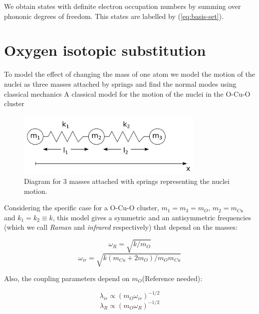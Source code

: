 We obtain states with definite electron occupation numbers by summing over phononic degrees of freedom. This states are labelled by (\ref{eq:basis-set}).


\section{Oxygen isotopic substitution}

To model the effect of changing the mass of one atom we model the motion of the nuclei as three masses attached by springs and find the normal modes using classical mechanics A classical model for the motion of the nuclei in the O-Cu-O cluster

\begin{figure}[ht!]
\centering
\includegraphics[width=0.8\textwidth]{images/3-masses-2-springs-linear.png}
\caption{Diagram for 3 masses attached with springs representing the nuclei motion.}
\label{fig:3-mases-2-springs}
\end{figure}

Considering the specific case for a O-Cu-O cluster, $m_1=m_3=m_O$, $m_2=m_{Cu}$ and $k_1=k_2\equiv k$, this model gives a symmetric and an antisymmetric frequencies (which we call \textit{Raman} and \textit{infrared} respectively) that depend on the masses: 

\begin{equation}\label{eq:omegaR}
\omega_{R}= \sqrt{k/m_O}
\end{equation}
\begin{equation}\label{eq:omegair}
\omega_{ir} = \sqrt{k(m_{Cu}+2m_O)/m_Om_{Cu}}
\end{equation}

Also, the coupling parameters depend on $m_O$(Reference needed):

\begin{equation}\label{eq:ir-coupl-isot}
\lambda_{ir}\propto (m_O\omega_{ir})^{-1/2}
\end{equation}
\begin{equation}\label{eq:Ram-coupl-isot}
\lambda_R\propto (m_O\omega_{R})^{-1/2}
\end{equation}

